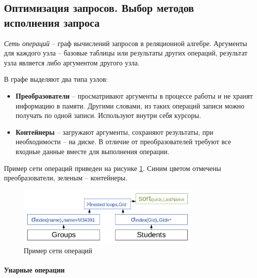 \subsection{Оптимизация запросов. Выбор методов исполнения запроса}

\begin{definition}
	\textit{Сеть операций} -- граф вычислений запросов в реляционной алгебре. Аргументы для каждого
	узла -- базовые таблицы или результаты других операций, результат узла является либо аргументом
	другого узла.
\end{definition}

В графе выделяют два типа  узлов:

\begin{itemize}
	\item \textbf{Преобразователи} -- просматривают аргументы в процессе работы и не хранят
	      информацию в памяти. Другими словами, из таких операций записи можно получать по одной записи.
	      Используют внутри себя курсоры.
	\item \textbf{Контейнеры} -- загружают аргументы, сохраняют результаты, при необходимости -- на
	      диске. В отличие от преобразователей требуют все входные данные вместе для выполнения операции.
\end{itemize}

Пример сети операций приведен на рисунке \ref{operation-network}. Синим цветом отмечены
преобразователи, зеленым -- контейнеры.

\begin{figure}[H]
	\centering
	\includegraphics[width=0.8\textwidth]{../assets/kgeorgiy/optimization/Network_Students_Types.svg.png}
	\caption{Пример сети операций}
	\label{operation-network}
\end{figure}

\paragraph{Унарные операции}

